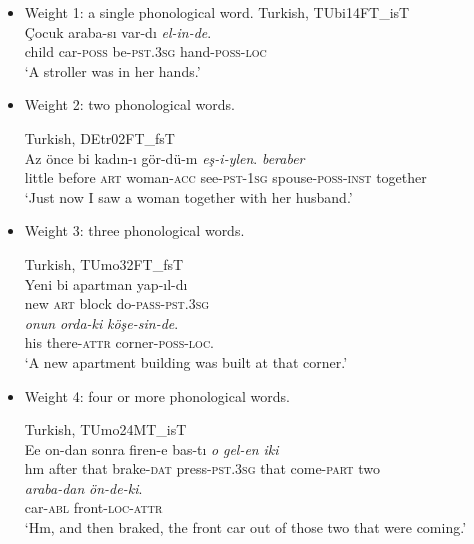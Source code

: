 \begin{itemize}
\item{Weight 1:} a single phonological word.
\ea%
  \label{ex:key:40} Turkish, TUbi14FT\_isT \\
     \gll Çocuk  araba-sı  var-dı    \textit{el-in-de}. \\
child  car-\textsc{poss}  be-\textsc{pst.3sg}  hand-\textsc{poss-loc}\\
\glt ‘A stroller was in her hands.’ 
  \z

\item{Weight 2:} two phonological words.

\ea%
  \label{ex:key:41} Turkish, DEtr02FT\_fsT \\
     \gll Az   önce   bi   kadın-ı    gör-dü-m  \textit{eş-i-ylen}.   \textit{beraber}\\
little  before  \textsc{art}  woman-\textsc{acc}  see\textsc{-pst-1sg}  spouse-\textsc{poss-inst}  together \\
\glt ‘Just now I saw a woman together with her husband.’ 
  \z

\item{Weight 3:} three phonological words.

\ea%
  \label{ex:key:42}  Turkish, TUmo32FT\_fsT \\
     \gll Yeni  bi  apartman  yap-ıl-dı   \\
new  \textsc{art}  block    do-\textsc{pass-pst.3sg}\\

        \gll \textit{onun}  \textit{orda-ki}    \textit{köşe-sin-de}.\\
his  there-\textsc{attr}  corner-\textsc{poss-loc}.\\
\glt ‘A new apartment building was built at that corner.’
  \z

\item{Weight 4:} four or more phonological words.

\ea%
  \label{ex:key:43} Turkish, TUmo24MT\_isT \\
     \gll Ee  on-dan  sonra  firen-e    bas-tı    \textit{o}  \textit{gel-en} \textit{iki} \\
            hm  after  that  brake-\textsc{dat}  press\textsc{-pst.3sg}  that  come-\textsc{part}  two  \\
    \gll \textit{araba-dan}  \textit{ön-de-ki}.\\
                    car-\textsc{abl}  front\textsc{-loc-attr}  \\
\glt ‘Hm, and then braked, the front car out of those two that were coming.’ 
  \z
\end{itemize}

